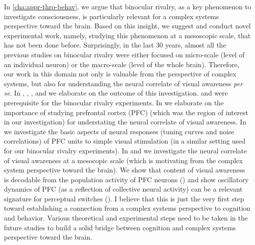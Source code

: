 In \autoref{cha:appr-thro-behav}, we argue that binocular rivalry,
as a key phenomenon to investigate consciousness,
is particularly relevant for a complex systems perspective toward the brain.
Based on this insight,
we suggest and conduct novel experimental work,
namely, studying this phenomenon at a mesoscopic scale, that has not been done before.
Surprisingly, in the last 30 years, almost all the previous studies on binocular rivalry were either focused on micro-scale (level of an individual neuron) or the macro-scale (level of the whole brain).
Therefore, our work in this domain not only is valuable from the perspective of complex systems,
but also for understanding the neural correlate of visual awareness \emph{per se}.
In , , , and  we elaborate on the outcome of this investigation.
 and  were prerequisite for the binocular rivalry experiments.
In  we elaborate on the importance of studying prefrontal cortex (PFC)
(which was the region of interest in our investigation)
for understating the neural correlate of visual awareness.
In  we investigate
the basic aspects of neural responses (tuning curves and noise correlations) of PFC units to simple visual stimulation
(in a similar setting used for our binocular rivalry experiments).
In  and  we investigate the neural correlate of visual awareness at a mesocopic scale
(which is motivating from the complex system perspective toward the brain).
We show that content of visual awareness is decodable from the population activity of PFC neurons ()
and show oscillatory dynamics of PFC (as a reflection of collective neural activity) can be a relevant signature for perceptual switches ().
I believe that this is just the very first step toward establishing a connection from a complex systems perspective to cognition and behavior.
Various theoretical and experimental steps need to be taken in the future studies to build a solid bridge between cognition and complex systems perspective toward the brain.

